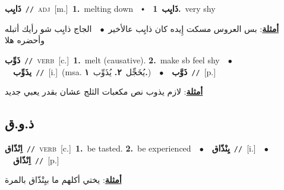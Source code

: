 \documentclass[10pt,a4paper,twoside]{article} %
\begin{document}
\begin{multicols}{2}
{{{{{{{{{\setlength\topsep{0pt}\textbf{\foreignlanguage{arabic}{ذَايِب}}\ {\color{gray}\texttt{//}\color{black}}\ \textsc{adj}\ [m.]\ \textbf{1.}~melting down\ \ $\smblkdiamond$\ \ \setlength\topsep{0pt}\textbf{\foreignlanguage{arabic}{ذَايِب}}\ \textbf{1.}~very shy\  \begin{flushright}\color{gray}\foreignlanguage{arabic}{\textbf{\underline{\foreignlanguage{arabic}{أمثلة}}}: بس العروس مسكت إِيده كان ذايِب عالأخير\ $\bullet$\ \  الجاج ذايِب شو رأيك أتبله وأحضره هلا}\end{flushright}\color{black}} \vspace{2mm}

{\setlength\topsep{0pt}\textbf{\foreignlanguage{arabic}{ذَوِّب}}\ {\color{gray}\texttt{//}\color{black}}\ \textsc{verb}\ [c.]\ \textbf{1.}~melt (causative).  \textbf{2.}~make sb feel shy\ \ $\bullet$\ \ \setlength\topsep{0pt}\textbf{\foreignlanguage{arabic}{يذَوِّب}}\ {\color{gray}\texttt{//}\color{black}}\ [i.]\ \color{gray}(msa. \foreignlanguage{arabic}{يُخَجِّل}~\foreignlanguage{arabic}{\textbf{٢.}}  \foreignlanguage{arabic}{يُذَوِّب}~\foreignlanguage{arabic}{\textbf{١.}})\color{black}\ \ $\bullet$\ \ \setlength\topsep{0pt}\textbf{\foreignlanguage{arabic}{ذَوَّب}}\ {\color{gray}\texttt{//}\color{black}}\ [p.]\  \begin{flushright}\color{gray}\foreignlanguage{arabic}{\textbf{\underline{\foreignlanguage{arabic}{أمثلة}}}: لازم يذوب نص مكعبات الثلج عشان بقدر يعبي جديد}\end{flushright}\color{black}} \vspace{2mm}

\vspace{-3mm}
\subsection*{\color{blue}\foreignlanguage{arabic}{ذ.و.ق}\color{blue}{}} 

{\setlength\topsep{0pt}\textbf{\foreignlanguage{arabic}{اِنْذّاق}}\ {\color{gray}\texttt{//}\color{black}}\ \textsc{verb}\ [c.]\ \textbf{1.}~be tasted.  \textbf{2.}~be experienced\ \ $\bullet$\ \ \setlength\topsep{0pt}\textbf{\foreignlanguage{arabic}{يِنْذّاق}}\ {\color{gray}\texttt{//}\color{black}}\ [i.]\ \ $\bullet$\ \ \setlength\topsep{0pt}\textbf{\foreignlanguage{arabic}{اِنْذّاق}}\ {\color{gray}\texttt{//}\color{black}}\ [p.]\  \begin{flushright}\color{gray}\foreignlanguage{arabic}{\textbf{\underline{\foreignlanguage{arabic}{أمثلة}}}: يختي أكلهم ما بيِنْذّاق بالمرة}\end{flushright}\color{black}} \vspace{2mm}

}}}}}}}}
\end{multicols}
\end{document}

